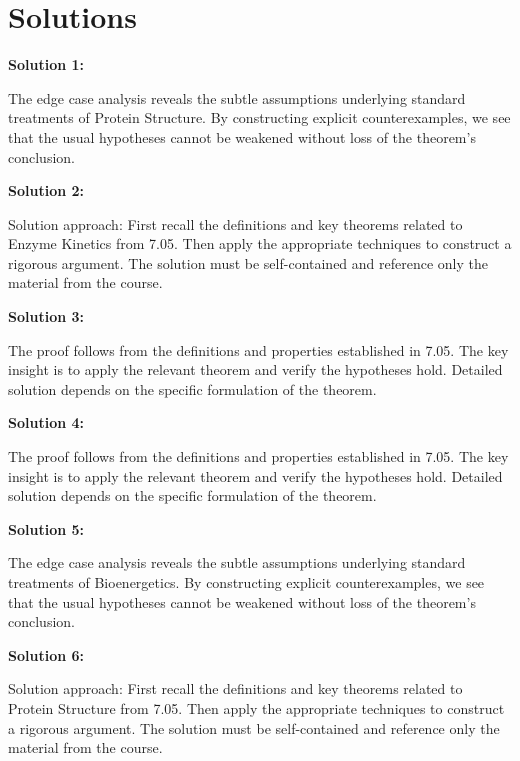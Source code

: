 \documentclass[12pt,a4paper]{exam}
\begin{document}
\newpage
\section*{Solutions}

\textbf{Solution 1:}

The edge case analysis reveals the subtle assumptions underlying standard treatments of Protein Structure. By constructing explicit counterexamples, we see that the usual hypotheses cannot be weakened without loss of the theorem's conclusion.

\vspace{0.5cm}

\textbf{Solution 2:}

Solution approach: First recall the definitions and key theorems related to Enzyme Kinetics from 7.05. Then apply the appropriate techniques to construct a rigorous argument. The solution must be self-contained and reference only the material from the course.

\vspace{0.5cm}

\textbf{Solution 3:}

The proof follows from the definitions and properties established in 7.05. The key insight is to apply the relevant theorem and verify the hypotheses hold. Detailed solution depends on the specific formulation of the theorem.

\vspace{0.5cm}

\textbf{Solution 4:}

The proof follows from the definitions and properties established in 7.05. The key insight is to apply the relevant theorem and verify the hypotheses hold. Detailed solution depends on the specific formulation of the theorem.

\vspace{0.5cm}

\textbf{Solution 5:}

The edge case analysis reveals the subtle assumptions underlying standard treatments of Bioenergetics. By constructing explicit counterexamples, we see that the usual hypotheses cannot be weakened without loss of the theorem's conclusion.

\vspace{0.5cm}

\textbf{Solution 6:}

Solution approach: First recall the definitions and key theorems related to Protein Structure from 7.05. Then apply the appropriate techniques to construct a rigorous argument. The solution must be self-contained and reference only the material from the course.
\end{document}
